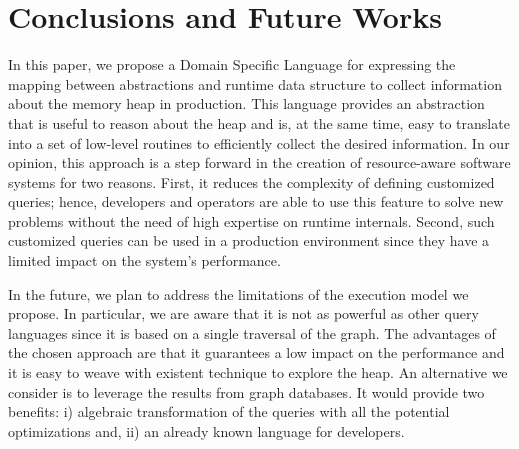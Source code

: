 \section{Conclusions and Future Works}\label{sec:conclusions}

In this paper, we propose a Domain Specific Language for expressing the mapping between abstractions and runtime data structure to collect information about the memory heap in production. This language provides an abstraction that is useful to reason about the heap and is, at the same time, easy to translate into a set of low-level routines to efficiently collect the desired information.
In our opinion, this approach is a step forward in the creation of resource-aware software systems for two reasons. 
First, it reduces the complexity of defining customized queries; hence, developers and operators are able to use this feature to solve new problems without the need of high expertise on runtime internals.
Second, such customized queries can be used in a production environment since they have a limited impact on the system's performance.

In the future, we plan to address the limitations of the execution model we propose.
In particular, we are aware that it is not as powerful as other query languages since it is based on a single traversal of the graph.
The advantages of the chosen approach are that it guarantees a low impact on the performance and it is easy to weave with existent technique to explore the heap.
An alternative we consider is to leverage the results from graph databases.
It would provide two benefits: i) algebraic transformation of the queries with all the potential optimizations and, ii) an already known language for developers.


